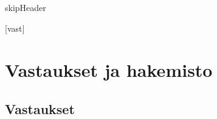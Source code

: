 



\finshortdate

\ifcsname skipHeader\endcsname
\else
	\kansilehti

	\newpage
	

	\newpage
	

	\newpage
	
\fi

\tableofcontents
{}
[vast]


\chapter{Vastaukset ja hakemisto}
\section*{Vastaukset}
\begin{vastaussivu}

\end{vastaussivu}

\newpage
{}
\printindex


